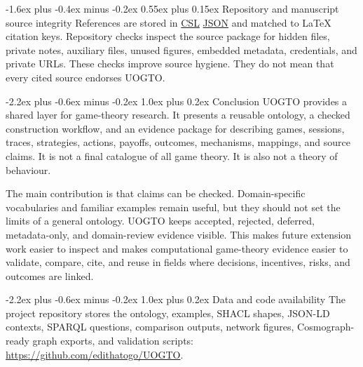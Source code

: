 \documentclass[11pt]{article}
\makeatletter
\renewcommand\section{\@startsection{section}{1}{\z@}%
  {-2.2ex plus -0.6ex minus -0.2ex}%
  {1.0ex plus 0.2ex}%
  {\normalfont\Large\bfseries\color{uogtoInk}}}
\renewcommand\subsection{\@startsection{subsection}{2}{\z@}%
  {-1.6ex plus -0.4ex minus -0.2ex}%
  {0.55ex plus 0.15ex}%
  {\normalfont\large\bfseries\color{uogtoInk}}}
\newcommand{\abblink}[2]{\hyperlink{abbr:#1}{#2}}
\makeatother
\begin{document}
\subsection{Repository and manuscript source integrity}
References are stored in \abblink{csl}{CSL} \abblink{json}{JSON} and matched to LaTeX citation keys. Repository checks inspect the source package for hidden files, private notes, auxiliary files, unused figures, embedded metadata, credentials, and private URLs. These checks improve source hygiene. They do not mean that every cited source endorses UOGTO.

\section{Conclusion}
UOGTO provides a shared layer for game-theory research. It presents a reusable ontology, a checked construction workflow, and an evidence package for describing games, sessions, traces, strategies, actions, payoffs, outcomes, mechanisms, mappings, and source claims. It is not a final catalogue of all game theory. It is also not a theory of behaviour.

The main contribution is that claims can be checked. Domain-specific vocabularies and familiar examples remain useful, but they should not set the limits of a general ontology. UOGTO keeps accepted, rejected, deferred, metadata-only, and domain-review evidence visible. This makes future extension work easier to inspect and makes computational game-theory evidence easier to validate, compare, cite, and reuse in fields where decisions, incentives, risks, and outcomes are linked.

\section{Data and code availability}
The project repository stores the ontology, examples, SHACL shapes, JSON-LD contexts, SPARQL questions, comparison outputs, network figures, Cosmograph-ready graph exports, and validation scripts:
\url{https://github.com/edithatogo/UOGTO}.
\end{document}
